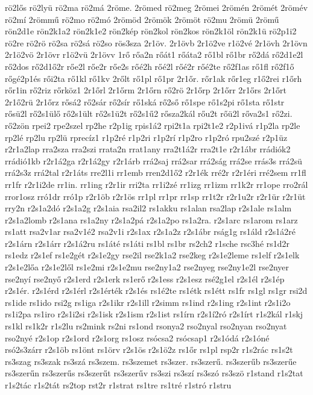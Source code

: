 {rö2lős
rö2lyü
rö2ma
rö2má
2röme.
2römed
rö2meg
2römei
2römén
2römét
2römév
rö2mí
2römmű
rö2mo
rö2mó
2römöd
2römök
2römöt
rö2mu
2römü
2römű
rön2d1e
rön2k1a2
rön2k1e2
rön2kép
rön2kol
rön2kos
rön2k1öl
rön2k1ü
rö2p1i2
rö2re
rö2rö
rö2sa
rö2sá
rö2so
rös3sza
2r1öv.
2r1övb
2r1ö2ve
r1ö2vé
2r1övh
2r1övn
2r1ö2vö
2r1övr
r1ö2vü
2r1övv
1rő
rőa2n
rőát1
rőáta2
rő1bl
rő1br
rő2dá
rő2d1e2l
rő2dos
rő2d1ő2r
rőe2l
rőe2r
rőe2s
rőé2h
rőé2l
rőé2r
rőé2te
rő2f1as
rő1fl
rő2f1ő
rőgé2p1és
rői2ta
rő1kl
rő1kv
2rőlt
rő1pl
rő1pr
2r1őr.
rőr1ak
rőr1eg
r1ő2rei
r1őrh
rőr1in
rő2riz
rőrköz1
2r1őrl
2r1őrm
2r1őrn
rő2rö
2r1őrp
2r1őrr
2r1őrs
2r1őrt
2r1ő2rü
2r1őrz
rősá2
rő2sár
rő2sír
rő1ská
rő2ső
rő1spe
rő1s2pi
rő1sta
rő1str
rősü2l
rő2s1ülő
rő2s1ült
rő2s1ü2t
rő2s1ű2
rősza2kál
rőu2t
rőü2l
rőva2s1
rő2zi.
rő2zön
rpei2
rpe2szel
rp2he
r2p1ig
rpis1á2
rpi2t1a
rpi2t1e2
r2p1ivá
r1p2la
rp2le
rp2lé
rp2lu
rp2lü
rprecíz1
r1p2ré
r1p2ri
r1p2rí
r1p2ro
r1p2ró
rpu2szé
r2p1üz
r2r1a2lap
rra2sza
rra2szi
rrata2n
rrat1any
rra2t1á2r
rra2t1e
r2r1ábr
rrádiók2
rrádió1kb
r2r1á2ga
r2r1á2gy
r2r1árb
rrá2saj
rrá2sar
rrá2ság
rrá2se
rrás3s
rrá2sü
rrá2s3z
rrá2tal
r2r1áts
rre2l1i
rr1emb
rren2d1ő2
r2r1ék
rré2r
r2r1éri
rré2sem
rr1fl
rr1fr
r2r1i2de
rr1in.
rr1ing
r2r1ir
rri2ta
rr1i2zé
rr1izg
rr1izm
rr1k2r
rr1ope
rro2rál
rror1osz
rró1dr
rró1p
r2r1öb
r2r1ös
rr1pl
rr1pr
rr1sp
rr1t2r
r2r1u2r
r2r1ür
r2r1üt
rry2n
r2s1a2dó
r2s1a2g
r2s1aia
rsa2il2
rs1akku
rs1alan
rsa2lap
r2s1ale
rs1alm
r2s1a2lomb
r2s1ana
rs1a2ny
r2s1a2pá
r2s1a2po
rs1a2ra.
r2s1arc
rs1arom
rs1arz
rs1att
rsa2v1ar
rsa2v1é2
rsa2v1i
r2s1ax
r2s1a2z
r2s1ábr
rság1g
rs1áld
r2s1á2ré
r2s1árn
r2s1árr
r2s1á2ru
rs1áté
rs1áti
rs1bl
rs1br
rs2ch2
r1sche
rsc3hé
rs1d2r
rs1edz
r2s1ef
rs1e2gét
r2s1e2gy
rse2il
rse2k1a2
rse2keg
r2s1e2leme
rs1elf
r2s1elk
r2s1e2lőa
r2s1e2lől
rs1e2mi
r2s1e2mu
rse2ny1a2
rse2nyeg
rse2ny1e2l
rse2nyer
rse2nyí
rse2nyő
r2s1erd
r2s1erk
rs1erő
r2s1ess
r2s1esz
rsé2g1el
r2s1él
r2s1ép
r2s1ér.
r2s1érd
r2s1érl
r2s1érték
r2s1és
rs1é2te
rs1étk
rs1étt
rs1fr
rs1gl
rs1gr
rsi2d
rs1ide
rs1ido
rsi2g
rs1iga
r2s1ikr
r2s1ill
r2simm
rs1ind
r2s1ing
r2s1int
r2s1i2o
rs1i2pa
rs1iro
r2s1i2si
r2s1isk
r2s1ism
r2s1ist
rs1írn
r2s1í2ró
r2s1írt
r1s2kál
r1skj
rs1kl
rs1k2r
r1s2lu
rs2mink
rs2ni
rs1ond
rsonya2
rso2nyal
rso2nyan
rso2nyat
rso2nyé
r2s1op
r2s1ord
r2s1org
rs1osz
rsócsa2
rsócsap1
r2s1ódá
r2s1óné
rsó2s3zárr
r2s1öb
rs1önt
rs1örv
r2s1ös
r2s1ö2z
rs1őr
rs1pl
rsp2r
r1s2rác
rs1s2t
rs3szag
rs3szak
rs3szá
rs3szem.
rs3szemet
rs3szer.
rs3szerű.
rs3szerűb
rs3szerűe
rs3szerűn
rs3szerűs
rs3szerűt
rs3szerűv
rs3szi
rs3szí
rs3szó
rs3szö
r1stand
r1s2tat
r1s2tác
r1s2tát
rs2top
rst2r
r1strat
rs1tre
rs1tré
r1stró
r1stru
}
